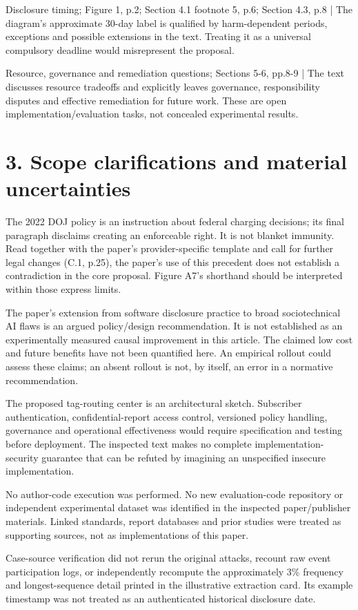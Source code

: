 \documentclass[10pt]{article}
\begin{document}
Disclosure timing; Figure 1, p.2; Section 4.1 footnote 5, p.6; Section 4.3, p.8 | The diagram’s approximate 30-day label is qualified by harm-dependent periods, exceptions and possible extensions in the text. Treating it as a universal compulsory deadline would misrepresent the proposal.\par
Resource, governance and remediation questions; Sections 5-6, pp.8-9 | The text discusses resource tradeoffs and explicitly leaves governance, responsibility disputes and effective remediation for future work. These are open implementation/evaluation tasks, not concealed experimental results.\par
\section*{3. Scope clarifications and material uncertainties}
The 2022 DOJ policy is an instruction about federal charging decisions; its final paragraph disclaims creating an enforceable right. It is not blanket immunity. Read together with the paper’s provider-specific template and call for further legal changes (C.1, p.25), the paper’s use of this precedent does not establish a contradiction in the core proposal. Figure A7’s shorthand should be interpreted within those express limits.\par
The paper’s extension from software disclosure practice to broad sociotechnical AI flaws is an argued policy/design recommendation. It is not established as an experimentally measured causal improvement in this article. The claimed low cost and future benefits have not been quantified here. An empirical rollout could assess these claims; an absent rollout is not, by itself, an error in a normative recommendation.\par
The proposed tag-routing center is an architectural sketch. Subscriber authentication, confidential-report access control, versioned policy handling, governance and operational effectiveness would require specification and testing before deployment. The inspected text makes no complete implementation-security guarantee that can be refuted by imagining an unspecified insecure implementation.\par
No author-code execution was performed. No new evaluation-code repository or independent experimental dataset was identified in the inspected paper/publisher materials. Linked standards, report databases and prior studies were treated as supporting sources, not as implementations of this paper.\par
Case-source verification did not rerun the original attacks, recount raw event participation logs, or independently recompute the approximately 3\% frequency and longest-sequence detail printed in the illustrative extraction card. Its example timestamp was not treated as an authenticated historical disclosure date.\par
\end{document}

